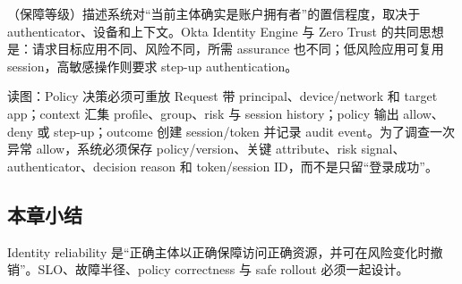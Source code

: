 （保障等级）描述系统对“当前主体确实是账户拥有者”的置信程度，取决于 authenticator、设备和上下文。Okta Identity Engine 与 Zero Trust 的共同思想是：请求目标应用不同、风险不同，所需 assurance 也不同；低风险应用可复用 session，高敏感操作则要求 step-up authentication。


\begin{knowledgebox}{读图：Policy 决策必须可重放}
Request 带 principal、device/network 和 target app；context 汇集 profile、group、risk 与 session history；policy 输出 allow、deny 或 step-up；outcome 创建 session/token 并记录 audit event。为了调查一次异常 allow，系统必须保存 policy/version、关键 attribute、risk signal、authenticator、decision reason 和 token/session ID，而不是只留“登录成功”。
\end{knowledgebox}

\subsection{本章小结}

Identity reliability 是“正确主体以正确保障访问正确资源，并可在风险变化时撤销”。SLO、故障半径、policy correctness 与 safe rollout 必须一起设计。

